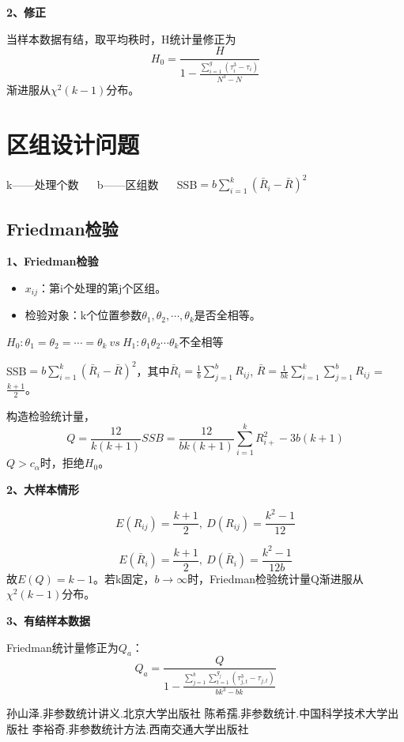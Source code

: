 \documentclass[lang=cn,10pt]{elegantbook}
\begin{document}
\textbf{2、修正}

当样本数据有结，取平均秩时，H统计量修正为
$$
H_0 = \frac H{1-\frac{\sum_{i = 1}^g (\tau_i^3 - \tau_i)}{N^3 - N}}
$$
渐进服从$\chi^2 (k - 1)$分布。

\chapter{区组设计问题}
\begin{center}
    k——处理个数 ~~ b——区组数 ~~ SSB$ = b \sum_{i = 1}^{k} (\bar{R}_i - \bar{R})^2$
\end{center}
\section{Friedman检验}
\textbf{1、Friedman检验}
\begin{itemize}
    \item $x_{ij}$：第i个处理的第j个区组。
    \item 检验对象：k个位置参数$\theta_1,\theta_2,\cdots,\theta_k$是否全相等。
\end{itemize}

\begin{center}
    $H_0:\theta_1 = \theta_2 = \cdots = \theta_k ~vs~ H_1: \theta_1 \theta_2 \cdots \theta_k$不全相等
\end{center}

SSB$ = b \sum_{i = 1}^{k} (\bar{R}_i - \bar{R})^2$，其中$\bar{R}_i = \frac1{b} \sum_{j = 1}^{b} R_{ij}$, $\bar{R} = \frac1{bk} \sum_{i = 1}^{k}\sum_{j = 1}^{b} R_{ij}$ = $\frac{k+1}{2}$。

构造检验统计量，
$$ 
Q = \frac{12}{k(k+1)}SSB = \frac{12}{bk(k+1)}\sum_{i = 1}^{k} R_{i+}^2 - 3 b(k+1)
$$
$Q > c_{\alpha}$时，拒绝$H_0$。

\textbf{2、大样本情形}

$$
E(R_{ij}) = \frac{k+1}2, ~ D(R_{ij}) = \frac{k^2-1}{12}
$$

$$
E(\bar{R}_i) = \frac{k+1}2, ~ D(\bar{R}_i) = \frac{k^2-1}{12b}
$$
故$E(Q) = k-1$。若k固定，$b \rightarrow \infty$时，Friedman检验统计量Q渐进服从$\chi^2(k-1)$分布。

\textbf{3、有结样本数据}

Friedman统计量修正为$Q_a$：
$$
Q_a = \frac{Q}{1 - \frac{\sum_{j = 1}^{b}\sum_{t = 1}^{g_j} (\tau_{j,t}^3 - \tau_{j,t})}{bk^3 - bk}}
$$








\begin{thebibliography}{3}
    孙山泽.非参数统计讲义.北京大学出版社
    陈希孺.非参数统计.中国科学技术大学出版社
    李裕奇.非参数统计方法.西南交通大学出版社
\end{thebibliography}
\end{document}
